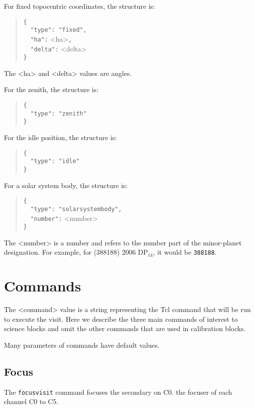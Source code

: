 For fixed topocentric coordinates, the structure is:
\begin{quote}
\verb|{|\\
\verb|  "type": "fixed",|\\
\verb|  "ha":| <ha>\verb|,|\\
\verb|  "delta":| <delta>\\
\verb|}|
\end{quote}

The <ha> and <delta> values are angles.

For the zenith, the structure is:
\begin{quote}
\verb|{|\\
\verb|  "type": "zenith"|\\
\verb|}|
\end{quote}

For the idle position, the structure is:
\begin{quote}
\verb|{|\\
\verb|  "type": "idle"|\\
\verb|}|
\end{quote}

For a solar system body, the structure is:
\begin{quote}
\verb|{|\\
\verb|  "type": "solarsystembody",|\\
\verb|  "number":| <number>\\
\verb|}|
\end{quote}

The <number> is a number and refers to the number part of the minor-planet designation. For example, for  (388188) 2006 DP$_{14}$, it would be \verb|388188|.

\section{Commands}

The <command> value is a string representing the Tcl command that will be run to execute the visit. Here we describe the three main commands of interest to science blocks and omit the other commands that are used in calibration blocks.

Many parameters of commands have default values.

\subsection{Focus}

The \verb|focusvisit| command focuses 
\ifcoatli
the secondary on C0.
\fi
\ifddoti
the focuser of each channel C0 to C5.
\fi

